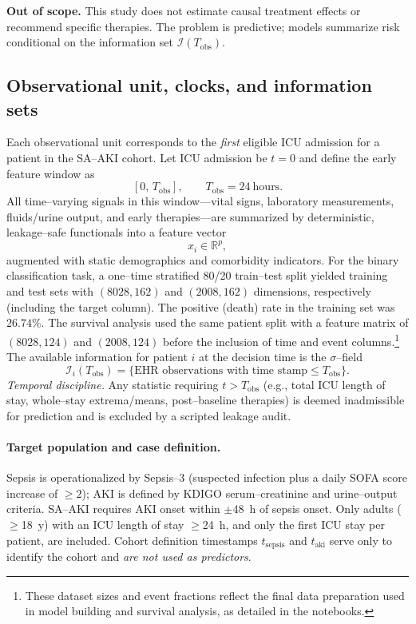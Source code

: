 \noindent\textbf{Out of scope.} This study does not estimate causal treatment effects or recommend specific therapies. The problem is predictive; models summarize risk conditional on the information set $\mathcal{I}(T_{\mathrm{obs}})$.

\subsection{Observational unit, clocks, and information sets}
Each observational unit corresponds to the \emph{first} eligible ICU admission for a patient in the SA--AKI cohort. Let ICU admission be $t{=}0$ and define the early feature window as
\[
[0,\,T_{\mathrm{obs}}], \qquad T_{\mathrm{obs}}=24~\text{hours}.
\]
All time–varying signals in this window—vital signs, laboratory measurements, fluids/urine output, and early therapies—are summarized by deterministic, leakage–safe functionals into a feature vector
\[
x_i \in \mathbb{R}^p,
\]
augmented with static demographics and comorbidity indicators. For the binary classification task, a one–time stratified 80/20 train–test split yielded training and test sets with $(8028, 162)$ and $(2008, 162)$ dimensions, respectively (including the target column). The positive (death) rate in the training set was $26.74\%$. The survival analysis used the same patient split with a feature matrix of $(8028, 124)$ and $(2008, 124)$ before the inclusion of time and event columns.\footnote{These dataset sizes and event fractions reflect the final data preparation used in model building and survival analysis, as detailed in the notebooks.}
The available information for patient $i$ at the decision time is the $\sigma$–field
\[
\mathcal{I}_i(T_{\mathrm{obs}})=\{\text{EHR observations with time stamp}\le T_{\mathrm{obs}}\}.
\]
\emph{Temporal discipline.} Any statistic requiring $t>T_{\mathrm{obs}}$ (e.g., total ICU length of stay, whole–stay extrema/means, post–baseline therapies) is deemed inadmissible for prediction and is excluded by a scripted leakage audit.

\paragraph{Target population and case definition.}
Sepsis is operationalized by Sepsis--3 (suspected infection plus a daily SOFA score increase of $\ge 2$); AKI is defined by KDIGO serum–creatinine and urine–output criteria. SA--AKI requires AKI onset within $\pm48$~h of sepsis onset. Only adults ($\ge$18~y) with an ICU length of stay $\ge$24~h, and only the first ICU stay per patient, are included. Cohort definition timestamps $t_{\text{sepsis}}$ and $t_{\text{aki}}$ serve only to identify the cohort and \emph{are not used as predictors}.

